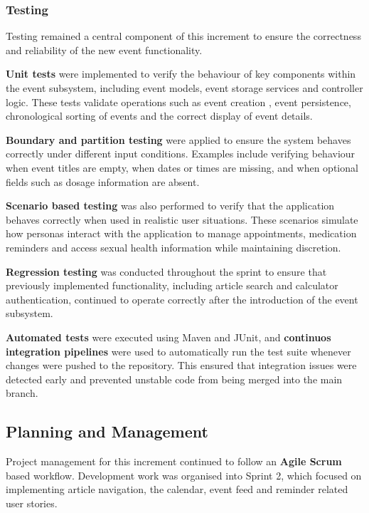 \documentclass[a4paper,12pt]{article}
\begin{document}
\subsubsection{Testing}

Testing remained a central component of this increment to ensure the correctness and reliability of the new event functionality.

\textbf{Unit tests} were implemented to verify the behaviour of key components within the event subsystem, including event models, event storage services and controller logic. These tests validate operations such as event creation , event persistence, chronological sorting of events and the correct display of event details.

\textbf{Boundary and partition testing} were applied to ensure the system behaves correctly under different input conditions. Examples include verifying behaviour when event titles are empty, when dates or times are missing, and when optional fields such as dosage information are absent.

\textbf{Scenario based testing} was also performed to verify that the application behaves correctly when used in realistic user situations. These scenarios simulate how personas interact with the application to manage appointments, medication reminders and access sexual health information while maintaining discretion.

\textbf{Regression testing} was conducted throughout the sprint to ensure that previously implemented functionality, including article search and calculator authentication, continued to operate correctly after the introduction of the event subsystem.

\textbf{Automated tests} were executed using Maven and JUnit, and \textbf{continuos integration pipelines} were used to automatically run the test suite whenever changes were pushed to the repository. This ensured that integration issues were detected early and prevented unstable code from being merged into the main branch.

\subsection{Planning and Management}

Project management for this increment continued to follow an \textbf{Agile Scrum} based workflow. Development work was organised into Sprint 2, which focused on implementing article navigation, the calendar, event feed and reminder related user stories.
\end{document}
